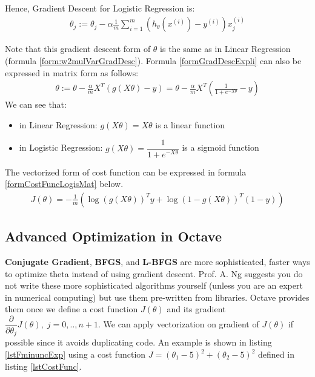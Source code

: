 Hence, Gradient Descent for Logistic Regression is:
\begin{align}\label{formGradDescExpli}
\theta_j := \theta_j - \alpha \frac{1}{m} \sum_{i=1}^m (h_\theta(x^{(i)}) - y^{(i)}) x_j^{(i)}
\end{align}

Note that this gradient descent form of $\theta$ is the same as in Linear Regression (formula \eqref{form:w2mulVarGradDesc}). Formula \eqref{formGradDescExpli} can also be expressed in matrix form as follows:
\begin{align}\label{formGradDescMat}
\theta := \theta - \frac{\alpha}{m} X^T (g(X\theta) - y) = \theta - \frac{\alpha}{m} X^T (\frac{1}{1 + e^{-X\theta}} - y)
\end{align}
We can see that: 
\begin{itemize}
	\item in Linear Regression: $g(X\theta) = X\theta$ is a linear function
	\item in Logistic Regression: $g(X\theta) = \dfrac{1}{1 + e^{-X\theta}}$ is a sigmoid function
\end{itemize}

The vectorized form of cost function can be expressed in formula \eqref{formCostFuncLogisMat} below.
\begin{align} \label{formCostFuncLogisMat}
J\left(\theta\right)  =  -\frac{1}{m}\left(\log\left(g\left(X\theta\right)\right)^{T}y+\log\left(1-g\left(X\theta\right)\right)^{T}\left(1-y\right)\right)
\end{align}


\subsection{Advanced Optimization in Octave}
\textbf{Conjugate Gradient}, \textbf{BFGS}, and \textbf{L-BFGS} are more sophisticated, faster ways to optimize theta instead of using gradient descent. Prof. A. Ng suggests you do not write these more sophisticated algorithms yourself (unless you are an expert in numerical computing) but use them pre-written from libraries. Octave provides them once we define a cost function $J(\theta)$ and its gradient $\dfrac{\partial}{\partial \theta_j}J(\theta), \; j=0,..,n+1$. We can apply vectorization on gradient of $J(\theta)$ if possible since it avoids duplicating code. An example is shown in listing \ref{lstFminuncExp} using a cost function $J = (\theta_1 - 5)^2 + (\theta_2 - 5)^2$ defined in listing \ref{lstCostFunc}.




